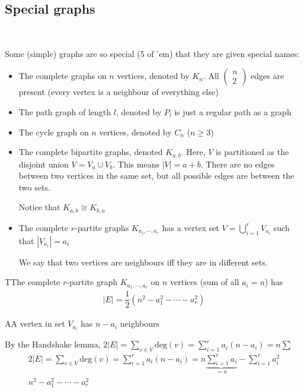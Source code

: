 \subsection{Special graphs}\hfill\\\par
\noindent Some (simple) graphs are so special (5 of 'em) that they are given special names:\par
\begin{itemize}
  \item The complete graphs on $n$ vertices, denoted by $K_n$. All $\begin{pmatrix}n\\2\end{pmatrix}$ edges are present (every vertex is a neighbour of everything else)
  \item The path graph of length $l$, denoted by $P_l$ is just a regular path as a graph
  \item The cycle graph on $n$ vertices, denoted by $C_n$ ($n\geq3$)
  \item The complete bipartite graphs, denoted $K_{a,b}$. Here, $V$ is partitioned as the disjoint union $V = V_a\cup V_b$. This means $\left|V\right| = a+b$. There are no edges between two vertices in the same set, but all possible edges are between the two sets.\par
    Notice that $K_{a,b}\cong K_{b,a}$
  \item The complete $r$-partite graphs $K_{a_1,\cdots,a_r}$ has a vertex set $V = \bigcup_{i=1}^{r}V_{a_i}$ such that $\left|V_{a_i}\right| = a_i$\par
    We say that two vertices are neighbours iff they are in different sets.
\end{itemize}
\par\bigskip
\begin{lem}
  TThe complete $r$-partite graph $K_{a_1,\cdots,a_r}$ on $n$ vertices (sum of all $a_i = n$) has
  \begin{equation*}
    \begin{gathered}
      \left|E\right| = \dfrac{1}{2}(n^2-a_1^2-\cdots-a_r^2)
    \end{gathered}
  \end{equation*}
\end{lem}
\par\bigskip
\begin{prf}
  AA vertex in set $V_{a_i}$ has $n-a_i$ neighbours\par
  \noindent By the Handshake lemma, $2\left|E\right|= \sum_{v\in V}\text{deg}(v) = \sum_{i=1}^{r}a_i(n-a_i) = n\sum_{}^{}$
  \begin{equation*}
    \begin{gathered}
      2\left|E\right|= \sum_{v\in V}\text{deg}(v) = \sum_{i=1}^{r}a_i(n-a_i) = n\underbrace{\sum_{i=1}^{r}a_i}_{\text{$=n$}}-\sum_{i=1}^{r}a_i^2\\
      n^2-a_1^2-\cdots-a_r^2
    \end{gathered}
  \end{equation*}
\end{prf}
